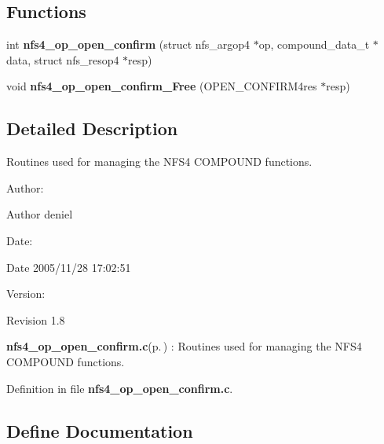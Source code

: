 \subsection*{Functions}
\begin{CompactItemize}
\item 
int {\bf nfs4\_\-op\_\-open\_\-confirm} (struct nfs\_\-argop4 $\ast$op, compound\_\-data\_\-t $\ast$data, struct nfs\_\-resop4 $\ast$resp)
\item 
void {\bf nfs4\_\-op\_\-open\_\-confirm\_\-Free} (OPEN\_\-CONFIRM4res $\ast$resp)
\end{CompactItemize}


\subsection{Detailed Description}
Routines used for managing the NFS4 COMPOUND functions. 

\begin{Desc}
\item[Author:]\begin{Desc}
\item[Author]deniel \end{Desc}
\end{Desc}
\begin{Desc}
\item[Date:]\begin{Desc}
\item[Date]2005/11/28 17:02:51 \end{Desc}
\end{Desc}
\begin{Desc}
\item[Version:]\begin{Desc}
\item[Revision]1.8 \end{Desc}
\end{Desc}
{\bf nfs4\_\-op\_\-open\_\-confirm.c}{\rm (p.\,\pageref{nfs4__op__open__confirm_8c})} : Routines used for managing the NFS4 COMPOUND functions.

Definition in file {\bf nfs4\_\-op\_\-open\_\-confirm.c}.

\subsection{Define Documentation}
